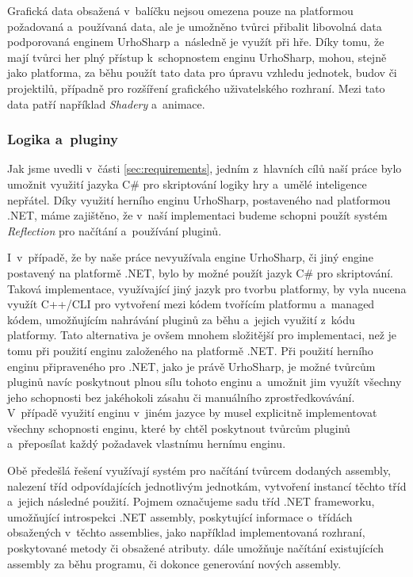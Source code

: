 Grafická data obsažená v~balíčku nejsou omezena pouze na platformou požadovaná a~používaná data, ale je umožněno tvůrci přibalit libovolná data podporovaná enginem UrhoSharp a~následně je využít při hře. Díky tomu, že mají tvůrci her plný přístup k~schopnostem enginu UrhoSharp, mohou, stejně jako platforma, za běhu použít tato data pro úpravu vzhledu jednotek, budov či projektilů, případně pro rozšíření grafického uživatelského rozhraní. Mezi tato data patří například \textit{Shadery} a~animace.

\subsubsection{Logika a~pluginy}
\label{sec:logicandplugins}
Jak jsme uvedli v~části \ref{sec:requirements}, jedním z~hlavních cílů naší práce bylo umožnit využití jazyka C\# pro skriptování logiky hry a~umělé inteligence nepřátel. Díky využití herního enginu UrhoSharp, postaveného nad platformou .NET, máme zajištěno, že v~naší implementaci budeme schopni použít systém \textit{Reflection} pro načítání a~používání pluginů. 

I~v~případě, že by naše práce nevyužívala engine UrhoSharp, či jiný engine postavený na platformě .NET, bylo by možné použít jazyk C\# pro skriptování. Taková implementace, využívající jiný jazyk pro tvorbu platformy, by vyla nucena využít C++/CLI pro vytvoření   mezi kódem tvořícím platformu a~managed kódem, umožňujícím nahrávání pluginů za běhu a~jejich využití z~kódu platformy. Tato alternativa je ovšem mnohem složitější pro implementaci, než je tomu při použití enginu založeného na platformě .NET. Při použití herního enginu připraveného pro .NET, jako je právě UrhoSharp, je možné tvůrcům pluginů navíc poskytnout plnou sílu tohoto enginu a~umožnit jim využít všechny jeho schopnosti bez jakéhokoli zásahu či manuálního zprostředkovávání. V~případě využití enginu v~jiném jazyce by musel   explicitně implementovat všechny schopnosti enginu, které by chtěl poskytnout tvůrcům pluginů a~přeposílat každý požadavek vlastnímu hernímu enginu.

Obě předešlá řešení využívají systém   pro načítání tvůrcem dodaných assembly, nalezení tříd odpovídajících jednotlivým jednotkám, vytvoření instancí těchto tříd a~jejich následné použití. Pojmem   označujeme sadu tříd .NET frameworku, umožňující introspekci .NET assembly, poskytující informace o~třídách obsažených v~těchto assemblies, jako například implementovaná rozhraní, poskytované metody či obsažené atributy.   dále umožňuje načítání existujících assembly za běhu programu, či dokonce generování nových assembly. 

